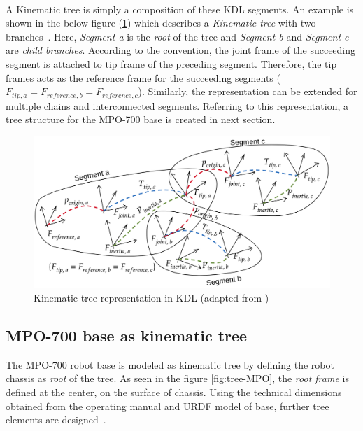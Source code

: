 \paragraph{}A Kinematic tree is simply a composition of these KDL segments. An example is shown in the below figure (\ref{fig:kinematic-tree}) which describes a \textit{Kinematic tree} with two branches~\cite{kinematictreeKDL}. Here, \textit{Segment a} is the \textit{root} of the tree and \textit{Segment b} and \textit{Segment c} are \textit{child branches}. According to the convention, the joint frame of the succeeding segment is attached to tip frame of the preceding segment. Therefore, the tip frames acts as the reference frame for the succeeding segments ($F_{tip, a} = F_{reference, b} = F_{reference, c}$). Similarly, the representation can be extended for multiple chains and interconnected segments. Referring to this representation, a tree structure for the MPO-700 base is created in next section.

\begin{figure}[h]
	\includegraphics[scale=0.36]{images/kinematic-tree}
	\caption{Kinematic tree representation in KDL (adapted from \cite{kinematictreeKDL})}
	\label{fig:kinematic-tree}
\end{figure}

\newpage
\subsection{MPO-700 base as kinematic tree}
The MPO-700 robot base is modeled as kinematic tree by defining the robot chassis as \textit{root} of the tree. As seen in the figure \ref{fig:tree-MPO}, the \textit{root frame} is defined at the center, on the surface of chassis. Using the technical dimensions obtained from the operating manual and URDF model of base, further tree elements are designed~\cite{MPO700}. 

